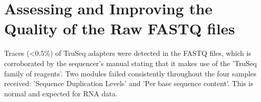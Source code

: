 \section{Assessing and Improving the Quality of the Raw FASTQ files}
\label{Assessing the Quality of the Raw FASTQ files}
Traces (<0.5\%) of TruSeq adapters were detected in the FASTQ files, which is corroborated by the sequencer's manual \citep{HiSeq2000} stating that it makes use of the 'TruSeq family of reagents'. 
Two modules failed consistently throughout the four samples received: 'Sequence Duplication Levels' and 'Per base sequence content'. This is normal and expected for RNA data.
%
%


